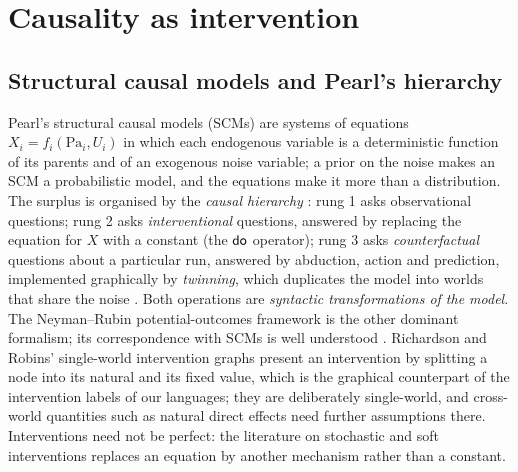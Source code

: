 \section{Causality as intervention}\label{sec:intv}

\subsection{Structural causal models and Pearl's hierarchy}

Pearl's structural causal models (SCMs) \cite{pearl2009causality,Pearl2018_book_of_why} are systems of equations $X_i = f_i(\mathrm{Pa}_i, U_i)$ in which each endogenous variable is a deterministic function of its parents and of an exogenous noise variable; a prior on the noise makes an SCM a probabilistic model, and the equations make it more than a distribution. The surplus is organised by the \emph{causal hierarchy} \cite{bareinboim:etal20}: rung 1 asks observational questions; rung 2 asks \emph{interventional} questions, answered by replacing the equation for $X$ with a constant (the $\mathsf{do}$ operator); rung 3 asks \emph{counterfactual} questions about a particular run, answered by abduction, action and prediction, implemented graphically by \emph{twinning}, which duplicates the model into worlds that share the noise \cite{Balke1994}. Both operations are \emph{syntactic transformations of the model}. The Neyman--Rubin potential-outcomes framework \cite{rubin1974} is the other dominant formalism; its correspondence with SCMs is well understood \cite{ibeling2023comparing}. Richardson and Robins' single-world intervention graphs \cite{richardson2013swig} present an intervention by splitting a node into its natural and its fixed value, which is the graphical counterpart of the intervention labels of our languages; they are deliberately single-world, and cross-world quantities such as natural direct effects need further assumptions there. Interventions need not be perfect: the literature on stochastic and soft interventions \cite{dawid2002_stoch_intv,didelez2006_stoch_mech_intv,Eberhardt_Scheines_2007,levis2024stochasticinterventionssensitivityanalysis} replaces an equation by another mechanism rather than a constant.

